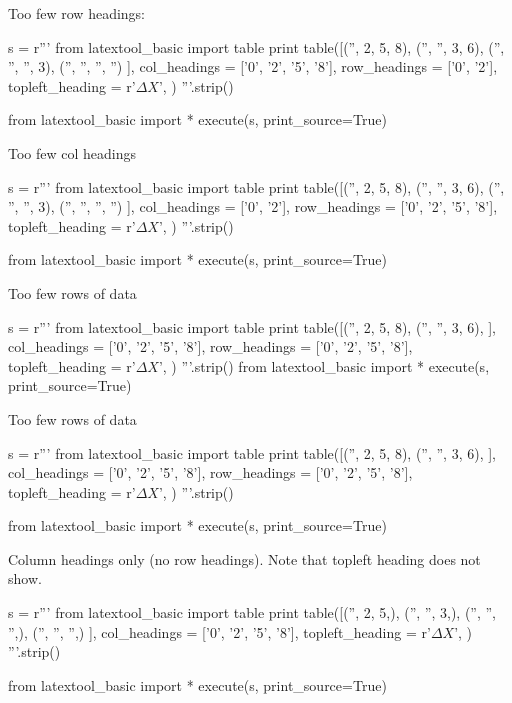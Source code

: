 \newpage
Too few row headings:
\begin{python}
s = r'''
from latextool_basic import table
print table([('',  2, 5,  8),
             ('', '', 3,  6),
             ('', '', '', 3),
             ('', '', '', '')
            ],
            col_headings = ['0', '2', '5', '8'],
            row_headings = ['0', '2'],
            topleft_heading = r'$\Delta X$',
           )
'''.strip()

from latextool_basic import *
execute(s, print_source=True)
\end{python}


\newpage
Too few col headings
\begin{python}
s = r'''
from latextool_basic import table
print table([('',  2, 5,  8),
             ('', '', 3,  6),
             ('', '', '', 3),
             ('', '', '', '')
            ],
            col_headings = ['0', '2'],
            row_headings = ['0', '2', '5', '8'],
            topleft_heading = r'$\Delta X$',
           )
'''.strip()

from latextool_basic import *
execute(s, print_source=True)
\end{python}


\newpage
Too few rows of data
\begin{python}
s = r'''
from latextool_basic import table
print table([('',  2, 5,  8),
             ('', '', 3,  6),
            ],
            col_headings = ['0', '2', '5', '8'],
            row_headings = ['0', '2', '5', '8'],
            topleft_heading = r'$\Delta X$',
           )
'''.strip()
from latextool_basic import *
execute(s, print_source=True)
\end{python}


\newpage
Too few rows of data
\begin{python}
s = r'''
from latextool_basic import table
print table([('',  2, 5,  8),
             ('', '', 3,  6),
            ],
            col_headings = ['0', '2', '5', '8'],
            row_headings = ['0', '2', '5', '8'],
            topleft_heading = r'$\Delta X$',
           )
'''.strip()

from latextool_basic import *
execute(s, print_source=True)
\end{python}


\newpage
Column headings only (no row headings).
Note that topleft heading does not show.

\begin{python}
s = r'''
from latextool_basic import table
print table([('',  2, 5,),
             ('', '', 3,),
             ('', '', '',),
             ('', '', '',)
            ],
            col_headings = ['0', '2', '5', '8'],
            topleft_heading = r'$\Delta X$',
           )
'''.strip()

from latextool_basic import *
execute(s, print_source=True)
\end{python}


